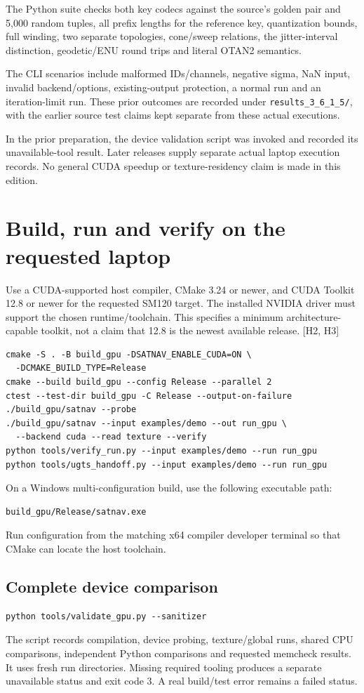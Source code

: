 \documentclass[11pt,a4paper]{article}
\newcommand{\code}[1]{\texttt{#1}}
\newcommand{\ext}[1]{\textcolor{muted}{[#1]}}
\begin{document}
The Python suite checks both key codecs against the source's golden pair and 5,000
random tuples, all prefix lengths for the reference key, quantization bounds, full
winding, two separate topologies, cone/sweep relations, the jitter-interval distinction,
geodetic/ENU round trips and literal OTAN2 semantics.

The CLI scenarios include malformed IDs/channels, negative sigma, NaN input, invalid
backend/options, existing-output protection, a normal run and an iteration-limit run.
These prior outcomes are recorded under \code{results\_3\_6\_1\_5/}, with the earlier source test claims
kept separate from these actual executions.

In the prior preparation, the device validation script was invoked and recorded
its unavailable-tool result. Later releases supply separate actual laptop execution records. No general CUDA speedup or texture-residency claim is made
in this edition.
\clearpage

\section{Build, run and verify on the requested laptop}
Use a CUDA-supported host compiler, CMake 3.24 or newer, and CUDA Toolkit 12.8 or newer
for the requested SM120 target. The installed NVIDIA driver must support the chosen
runtime/toolchain. This specifies a minimum architecture-capable toolkit, not a claim
that 12.8 is the newest available release. \ext{H2, H3}

\begin{lstlisting}
cmake -S . -B build_gpu -DSATNAV_ENABLE_CUDA=ON \
  -DCMAKE_BUILD_TYPE=Release
cmake --build build_gpu --config Release --parallel 2
ctest --test-dir build_gpu -C Release --output-on-failure
./build_gpu/satnav --probe
./build_gpu/satnav --input examples/demo --out run_gpu \
  --backend cuda --read texture --verify
python tools/verify_run.py --input examples/demo --run run_gpu
python tools/ugts_handoff.py --input examples/demo --run run_gpu
\end{lstlisting}
On a Windows multi-configuration build, use the following executable path:
\begin{lstlisting}
build_gpu/Release/satnav.exe
\end{lstlisting}
Run configuration from the matching x64 compiler developer terminal so that CMake can locate the host toolchain.

\subsection{Complete device comparison}
\begin{lstlisting}
python tools/validate_gpu.py --sanitizer
\end{lstlisting}
The script records compilation, device probing, texture/global runs, shared CPU
comparisons, independent Python comparisons and requested memcheck results. It
uses fresh run directories. Missing required tooling produces a separate unavailable
status and exit code 3. A real build/test error remains a failed status.
\end{document}
